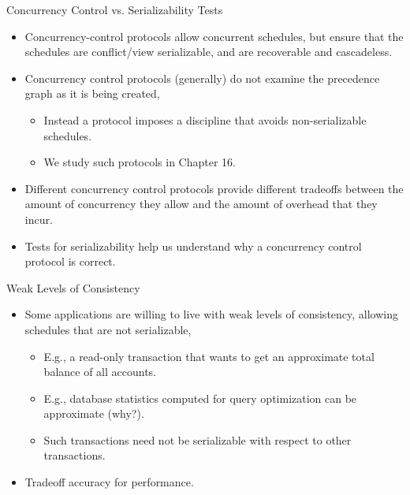 \documentclass[aspectratio=169]{beamer}
\begin{document}
\begin{frame}{Concurrency Control vs. Serializability Tests}

    \begin{itemize}
        \item Concurrency-control protocols allow concurrent schedules, but ensure that the schedules are conflict/view serializable, and are recoverable and cascadeless.
        \item Concurrency control protocols (generally) do not examine the precedence graph as it is being created,
            \begin{itemize}
                \item Instead a protocol imposes a discipline that avoids non-serializable schedules.
                \item We study such protocols in Chapter 16.
            \end{itemize}
        \item Different concurrency control protocols provide different tradeoffs between the amount of concurrency they allow and the amount of overhead that they incur.
        \item Tests for serializability help us understand why a concurrency control protocol is correct.
    \end{itemize}

\end{frame}

\begin{frame}{Weak Levels of Consistency}

    \begin{itemize}
        \item Some applications are willing to live with weak levels of consistency, allowing schedules that are not serializable,
            \begin{itemize}
                \item E.g., a read-only transaction that wants to get an approximate total balance of all accounts.
                \item E.g., database statistics computed for query optimization can be approximate (why?).
                \item Such transactions need not be serializable with respect to other transactions.
            \end{itemize}
        \item Tradeoff accuracy for performance.
    \end{itemize}

\end{frame}
\end{document}

